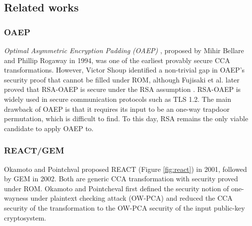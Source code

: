 \documentclass[runningheads]{llncs}
\begin{document}


\subsection{Related works}\label{sec:related-works}
\subsubsection{OAEP}
\textit{Optimal Asymmetric Encryption Padding (OAEP)} \cite{DBLP:conf/eurocrypt/BellareR94}, proposed by Mihir Bellare and Phillip Rogaway in 1994, was one of the earliest provably secure CCA transformations. However, Victor Shoup identified a non-trivial gap in OAEP's security proof that cannot be filled under ROM\cite{DBLP:conf/crypto/Shoup01}, although Fujisaki et al. later proved that RSA-OAEP is secure under the RSA assumption \cite{DBLP:conf/crypto/FujisakiOPS01}. RSA-OAEP is widely used in secure communication protocols such as TLS 1.2. The main drawback of OAEP is that it requires its input to be an one-way trapdoor permutation, which is difficult to find. To this day, RSA remains the only viable candidate to apply OAEP to.

\subsubsection{REACT/GEM} Okamoto and Pointchval proposed REACT \cite{DBLP:conf/ctrsa/OkamotoP01} (Figure \ref{fig:react}) in 2001, followed by GEM \cite{DBLP:conf/ctrsa/CoronHJPPT02} in 2002. Both are generic CCA transformation with security proved under ROM. Okamoto and Pointcheval first defined the security notion of one-wayness under plaintext checking attack (OW-PCA) and reduced the CCA security of the transformation to the OW-PCA security of the input public-key cryptosystem.
\end{document}
